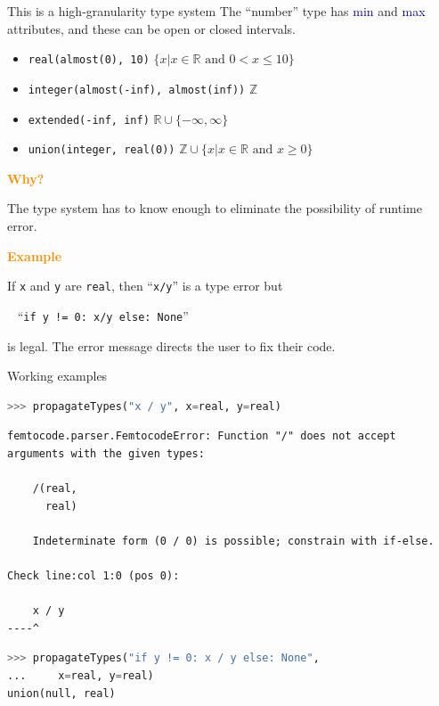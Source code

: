 \documentclass{beamer}
\begin{document}
\begin{frame}[fragile]{This is a high-granularity type system}
\vspace{0.5 cm}
The ``number'' type has \textcolor{darkblue}{min} and \textcolor{darkblue}{max} attributes, and these can be open or closed intervals.
\begin{itemize}
\item {\tt\small real(almost(0), 10)} \hfill $\{x | x \in \mathbb{R}\mbox{ and } 0 < x \le 10\}$
\item {\tt\small integer(almost(-inf), almost(inf))} \hfill $\mathbb{Z}$
\item {\tt\small extended(-inf, inf)} \hfill $\mathbb{R} \cup \{-\infty, \infty\}$
\item {\tt\small union(integer, real(0))} \hfill $\mathbb{Z} \cup \{x | x \in \mathbb{R}\mbox{ and } x \ge 0\}$
\end{itemize}

\vfill
\textcolor{darkorange}{\bf Why?}

The type system has to know enough to eliminate the possibility of runtime error.

\vspace{0.2 cm}
\textcolor{darkorange}{\bf Example}

If {\tt x} and {\tt y} are {\tt real}, then ``{\tt x/y}'' is a type error but

\vspace{0.2 cm}
\mbox{ } \hfill ``{\tt if y != 0:\ x/y else:\ None}'' \hfill \mbox{ }

\vspace{0.2 cm}
is legal. The error message directs the user to fix their code.
\end{frame}

\begin{frame}[fragile]{Working examples}
\vspace{0.2 cm}
\begin{lstlisting}[language=python]
>>> propagateTypes("x / y", x=real, y=real)
\end{lstlisting}
\color{red}
\begin{lstlisting}[basicstyle=\ttfamily\scriptsize]
femtocode.parser.FemtocodeError: Function "/" does not accept arguments with the given types:

    /(real,
      real)

    Indeterminate form (0 / 0) is possible; constrain with if-else.

Check line:col 1:0 (pos 0):

    x / y
----^
\end{lstlisting}

\color{black}
\begin{lstlisting}[language=python]
>>> propagateTypes("if y != 0: x / y else: None",
...     x=real, y=real)
union(null, real)
\end{lstlisting}
\end{frame}
\end{document}
